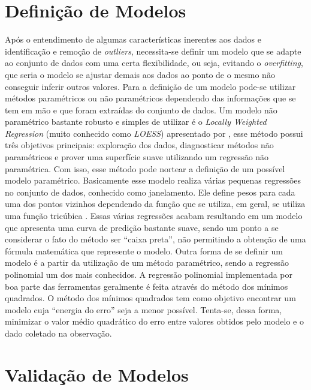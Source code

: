 \section{Definição de Modelos}\label{defmodels}

Após o entendimento de algumas características inerentes aos dados e
identificação e remoção de \textit{outliers}, necessita-se definir um modelo
que se adapte ao conjunto de dados com uma certa flexibilidade, ou seja,
evitando o \textit{overfitting}, que seria o modelo se ajustar demais aos dados
ao ponto de o mesmo não conseguir inferir outros valores. Para a definição
de um modelo pode-se utilizar métodos paramétricos ou não paramétricos
dependendo das informações que se tem em mão e que foram extraídas do conjunto
de dados. Um modelo não paramétrico bastante robusto e simples de utilizar é o
\textit{Locally Weighted Regression} (muito conhecido como \textit{LOESS})
apresentado por , esse método possui três objetivos
principais: exploração dos dados, diagnosticar métodos não paramétricos e prover
uma superfície suave utilizando um regressão não paramétrica. Com isso, esse
método pode nortear a definição de um possível modelo paramétrico. Basicamente
esse modelo realiza várias pequenas regressões no conjunto de dados, conhecido
como janelamento. Ele define pesos para cada uma dos pontos vizinhos dependendo da
função que se utiliza, em geral, se utiliza uma função tricúbica
\cite{cleveland:1988}. Essas várias regressões acabam resultando em um modelo
que apresenta uma curva de predição bastante suave, sendo um ponto a se
considerar o fato do método ser ``caixa preta'', não permitindo a obtenção de
uma fórmula matemática que represente o modelo. Outra forma de se definir um
modelo é a partir da utilização de um método paramétrico, sendo a regressão
polinomial um dos mais conhecidos. A regressão polinomial implementada por boa
parte das ferramentas geralmente é feita através do método dos mínimos
quadrados. O método dos mínimos quadrados tem como objetivo encontrar um modelo
cuja ``energia do erro'' seja a menor possível. Tenta-se, dessa forma, minimizar
o valor médio quadrático do erro entre valores obtidos pelo modelo e o dado
coletado na observação.

\section{Validação de Modelos}\label{valmodels}

